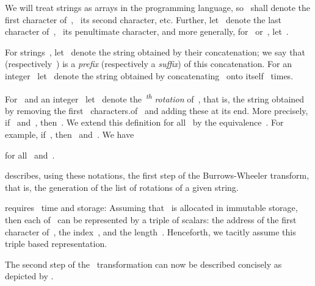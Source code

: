\documentclass[a4paper,12pt]{article}
\newcommand{\Abs}[1]{\ensuremath{\left|#1\right|}}
\numberwithin{algorithm}{section}
\begin{document}
We will treat strings as arrays in the \C programming language, so~ shall
  denote the first
  character of~,~  its second character, etc.
Further, let~ denote the last character of~,~ its penultimate character,
  and more generally, for~ or~,  let~.

For strings~, let~ denote the string obtained by their concatenation; we say
  that~ (respectively~) is a \emph{prefix} (respectively a \emph{suffix})
  of this concatenation.
For an integer~ let~ denote the string obtained by concatenating~
  onto itself~ times.

For~ and an integer~
  let~ denote the~\textsuperscript{\emph{th}} \emph{rotation}
  of~, that is, the string obtained by removing the
  first~ characters.of~ and adding these at its end.
More precisely, if~ and~,
  then~.
We extend this definition for all~
  by the equivalence~.
For example, if~,
  then~
  and~.
We have
 
for all~ and~.

 describes, using these notations,
   the first step of the Burrows-Wheeler transform, that is,  the generation
   of the list of rotations of a given string.
\begin{algorithm}
\caption{ }
\label{Algorithm:Generate}
\begin{algorithmic}[1]
\LET{n}{\Abs{α}}
\FOR{}
\STATE{}
\ENDFOR
\RETURN
\end{algorithmic}
\end{algorithm}

 requires~ time and storage:
Assuming that~ is allocated in immutable
  storage, then each of~ can be represented by
  a triple of scalars: the address of the first character of~,
  the index~, and the length~.
Henceforth, we  tacitly assume this triple based representation.

The second step of the~ transformation can now
  be described concisely as depicted by .


\begin{algorithm}[!hbt]
\caption{ \newline
\mbox{}\hfill
 }

\label{Algorithm:Last}
\begin{algorithmic}[1]
\LET{n}{\Abs{R}}
\FOR{}
  \STATE{}
  \STATE{}
\ENDFOR
\RETURN
\end{algorithmic}
\end{algorithm}
\end{document}

